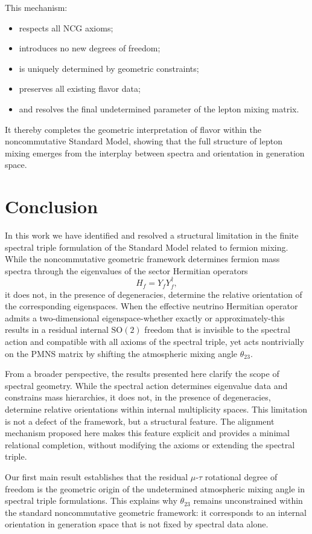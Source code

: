This mechanism:
\begin{itemize}
\item respects all NCG axioms;
\item introduces no new degrees of freedom;
\item is uniquely determined by geometric constraints;
\item preserves all existing flavor data;
\item and resolves the final undetermined parameter of the lepton mixing matrix.
\end{itemize}

It thereby completes the geometric interpretation of flavor within the noncommutative Standard Model, showing that the full structure of lepton mixing emerges from the interplay between spectra and orientation in generation space.


\section{Conclusion}

In this work we have identified and resolved a structural limitation in the finite spectral triple formulation of the Standard Model related to fermion mixing. While the noncommutative geometric framework determines fermion mass spectra through the eigenvalues of the sector Hermitian operators
\[
H_f = Y_f Y_f^\dagger,
\]
it does not, in the presence of degeneracies, determine the relative orientation of the corresponding eigenspaces. When the effective neutrino Hermitian operator admits a two-dimensional eigenspace-whether exactly or approximately-this results in a residual internal $\mathrm{SO}(2)$ freedom that is invisible to the spectral action and compatible with all axioms of the spectral triple, yet acts nontrivially on the PMNS matrix by shifting the atmospheric mixing angle $\theta_{23}$.

From a broader perspective, the results presented here clarify the scope of spectral geometry. While the spectral action determines eigenvalue data and constrains mass hierarchies, it does not, in the presence of degeneracies, determine relative orientations within internal multiplicity spaces. This limitation is not a defect of the framework, but a structural feature. The alignment mechanism proposed here makes this feature explicit and provides a minimal relational completion, without modifying the axioms or extending the spectral triple.

Our first main result establishes that the residual $\mu$-$\tau$ rotational degree of freedom is the geometric origin of the undetermined atmospheric mixing angle in spectral triple formulations. This explains why $\theta_{23}$ remains unconstrained within the standard noncommutative geometric framework: it corresponds to an internal orientation in generation space that is not fixed by spectral data alone.

